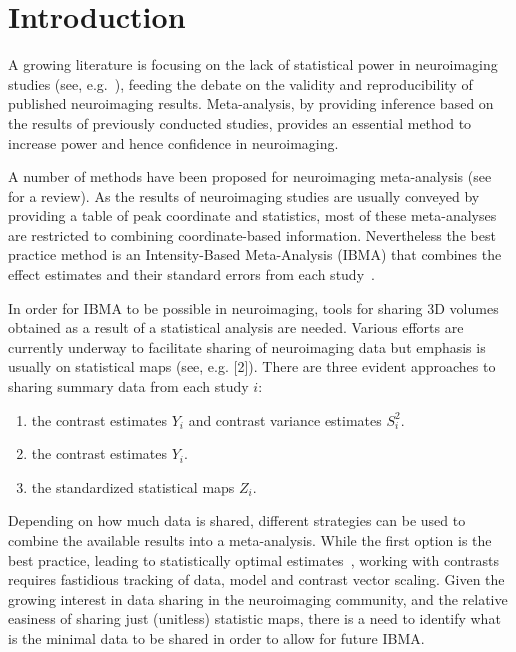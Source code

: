 \documentclass{llncs}
\newcommand{\effectvector}{Y}
\newcommand{\effect}[1][i]{\effectvector_{#1}}
\newcommand{\vareffect}[1][i]{S^2_{#1}}
\newcommand{\zeffect}[1][i]{Z_{#1}}
\begin{document}
\section{Introduction}

A growing literature is focusing on the lack of statistical power in neuroimaging studies (see, e.g.~\cite{Button2013}), feeding the debate on the validity and reproducibility of published neuroimaging results. Meta-analysis, by providing inference based on the results of previously conducted studies, provides an essential method to increase power and hence confidence in neuroimaging.

A number of methods have been proposed for neuroimaging meta-analysis (see~\cite{Radua2012} for a review). As the results of neuroimaging studies are usually conveyed by providing a table of peak coordinate and statistics, most of these meta-analyses are restricted to combining coordinate-based information. Nevertheless the best practice method is an Intensity-Based Meta-Analysis (IBMA) that combines the effect estimates and their standard errors from each study~\cite{Salimi-khorshidi2009}. 

In order for IBMA to be possible in neuroimaging, tools for sharing 3D volumes obtained as a result of a statistical analysis are needed. Various efforts are currently underway to facilitate sharing of neuroimaging data but emphasis is usually on statistical maps (see, e.g. [2]). There are three evident approaches to sharing summary data from each study $i$:
\begin{enumerate}
	\item the contrast estimates $\effect$ and contrast variance estimates $\vareffect$.
	\item the contrast estimates $\effect$.	
	\item the standardized statistical maps $\zeffect$.		
\end{enumerate}

Depending on how much data is shared, different strategies can be used to combine the available results into a meta-analysis. While the first option is the best practice, leading to statistically optimal estimates~\cite{Cummings2004}, working with contrasts requires fastidious tracking of data, model and contrast vector scaling. Given the growing interest in data sharing in the neuroimaging community, and the relative easiness of sharing just (unitless) statistic maps, there is a need to identify what is the minimal data to be shared in order to allow for future IBMA.
\end{document}

